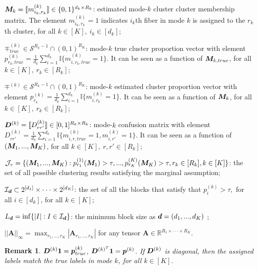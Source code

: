 \documentclass{article}
\newtheorem{remark}{Remark}
\begin{document}
\begin{appendices}
$\boldsymbol{M}_k= \llbracket m_{i_k,r_k}^{(k)} \rrbracket  \in \{0,1\}^{d_k\times R_k}$: estimated mode-$k$ cluster cluster membership matrix. The element $m_{i_k,r_k}^{(k)}=1$ indicates $i_k$th fiber in mode $k$ is assigned to the $r_k$th cluster, for all $k\in[K],~i_k\in[d_k]$;

$\mp^{(k)}_{true} \in \mathcal{S}^{R_k-1}\cap(0,1)^{R_K}$: mode-$k$ true cluster proportion vector with element $p_{r_k,true}^{(k)}=\frac{1}{d_k}\sum_{i=1}^{d_k}\mathbb{I}\{m_{i,r_k,true}^{(k)}=1\}$. It can be seen as a function of $\boldsymbol{M}_{k,true}$, for all $k\in[K],~r_k\in[R_k]$;

$\mp^{(k)} \in \mathcal{S}^{R_k-1}\cap(0,1)^{R_K}$: mode-$k$ estimated cluster proportion vector with element $p_{r_k}^{(k)}=\frac{1}{d_k}\sum_{i=1}^{d_k}\mathbb{I}\{m_{i,r_k}^{(k)}=1\}$. It can be seen as a function of $\boldsymbol{M}_k$,  for all $k\in[K],~r_k\in[R_k]$;

$\boldsymbol{D}^{(k)} = \llbracket D^{(k)}_{rr'} \rrbracket\in [0,1]^{R_k\times R_k}$: mode-$k$ confusion matrix with element $D_{rr'}^{(k)}=\frac{1}{d_k}\sum_{i=1}^{d_k}\mathbb{I}\{m_{i,r,true}^{(k)}=1,m_{i,r'}^{(k)}=1\}$. It can be seen as a function of $(\boldsymbol{M}_1,...,\boldsymbol{M}_K)$, for all $k\in[K],~r,r'\in[R_k]$;

$\mathcal{J}_{\tau}=\{(\boldsymbol{M}_1,...,\boldsymbol{M}_K): p^{(1)}_{r_1}(\boldsymbol{M}_1)>\tau,...,p^{(K)}_{r_K}(\boldsymbol{M}_K)>\tau, r_k\in[R_k], k\in[K]\}$: the set of all possible clustering results satisfying the marginal assumption;

$\mathcal{I}_{\bm{d}} \subset 2^{[d_1]}\times \cdot\cdot\cdot \times 2^{[d_K]}$: the set of all the blocks that satisfy that $p^{(k)}_{i}>\tau,$ for all $i\in[d_k]$, for all $k\in[K]$;

$L_{\bm{d}}=\inf\{|I|:I\in\mathcal{I}_{\bm{d}}\}$: the minimum block size as $\bm{d} = (d_1,...,d_K)$ ;


$||\boldsymbol{A}||_\infty=\max_{r_1,...,r_K}|\boldsymbol{A}_{r_1,...,r_K}|$ for any tensor $\boldsymbol{A}\in\mathbb{R}^{R_1\times\cdot\cdot\cdot\times R_K}$.

\begin{remark}
$\boldsymbol{D}^{(k)}\boldsymbol{1}=\boldsymbol{p}^{(k)}_{true}$, $\boldsymbol{D}^{(k)^T}\boldsymbol{1}=\boldsymbol{p}^{(k)}$. If $\boldsymbol{D}^{(k)}$ is diagonal, then the assigned labels match the true labels in mode $k$, for all $k\in[K]$. 
\end{remark}




\end{appendices}
\end{document}
